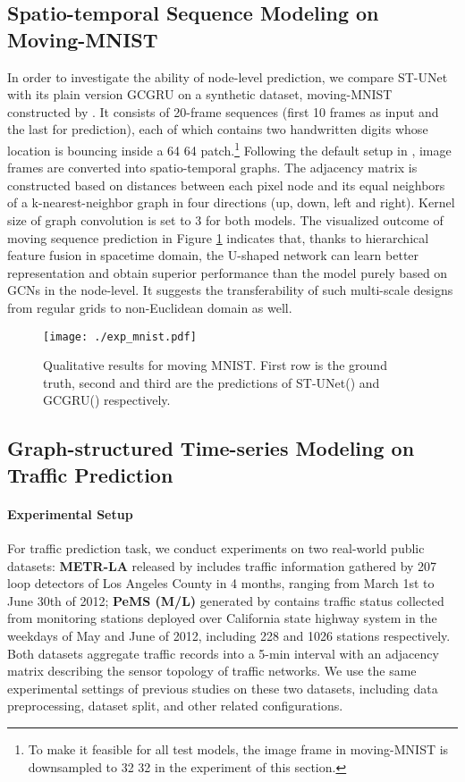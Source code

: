\documentclass[sigconf,screen]{acmart}
\begin{document}
\subsection{Spatio-temporal Sequence Modeling on Moving-MNIST}
In order to investigate the ability of node-level prediction, we compare ST-UNet with its plain version GCGRU on a synthetic dataset, moving-MNIST constructed by \cite{xingjian2015convolutional}. It consists of 20-frame sequences (first 10 frames as input and the last for prediction), each of which contains two handwritten digits whose location is bouncing inside a 64  64 patch.\footnote{To make it feasible for all test models, the image frame in moving-MNIST is downsampled to 32  32 in the experiment of this section.} Following the default setup in \cite{seo2018structured}, image frames are converted into spatio-temporal graphs. The adjacency matrix is constructed based on distances between each pixel node and its equal neighbors of a k-nearest-neighbor graph in four directions (up, down, left and right). Kernel size of graph convolution  is set to 3 for both models. The visualized outcome of moving sequence prediction in Figure \ref{fig:mmnist} indicates that, thanks to hierarchical feature fusion in spacetime domain, the U-shaped network can learn better representation and obtain superior performance than the model purely based on GCNs in the node-level. It suggests the transferability of such multi-scale designs from regular grids to non-Euclidean domain as well.

\begin{figure}
	\centering
	\texttt{[image: ./exp\_mnist.pdf]}
	\caption{\label{fig:mmnist}Qualitative results for moving MNIST. First row is the ground truth, second and third are the predictions of ST-UNet() and GCGRU() respectively.}
\end{figure}

\subsection{Graph-structured Time-series Modeling on Traffic Prediction}
\paragraph{Experimental Setup} 
For traffic prediction task, we conduct experiments on two real-world public datasets: \textbf{METR-LA} released by \cite{li2018dcrnn_traffic} includes traffic information gathered by 207 loop detectors of Los Angeles County in 4 months, ranging from March 1st to June 30th of 2012; \textbf{PeMS (M/L)} generated by \cite{yu2018spatio} contains traffic status collected from monitoring stations deployed over California state highway system in the weekdays of May and June of 2012, including 228 and 1026 stations respectively. Both datasets aggregate traffic records into a 5-min interval with an adjacency matrix describing the sensor topology of traffic networks. We use the same experimental settings of previous studies on these two datasets, including data preprocessing, dataset split, and other related configurations.
\end{document}
